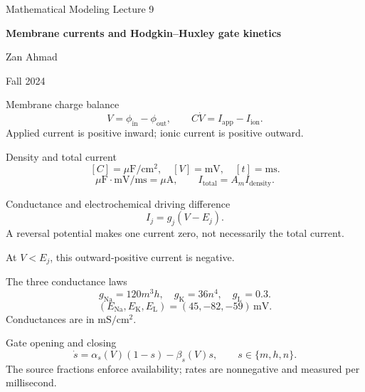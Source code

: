 \documentclass[aspectratio=169,11pt]{beamer}
\newcommand{\notestarget}{notes.pdf}\newcommand{\noteslabel}{Notes}
\begin{document}
\begin{frame}[plain]\vfill
{\small\color{accent} Mathematical Modeling \quad Lecture 9}\par\medskip
{\raggedright{}\LARGE\bfseries\color{ink} Membrane currents and Hodgkin--Huxley gate kinetics}\par\bigskip
Zan Ahmad\par\smallskip
{\small Fall 2024}\par\vfill\end{frame}
\renewcommand{\notestarget}{notes.pdf\#note-membrane-capacitance-and-the-sign-of-current}
\begin{frame}[t,fragile,label=slide-membrane-charge-balance]{Membrane charge balance}
\[V=\phi_{\mathrm{in}}-\phi_{\mathrm{out}},\qquad C\dot V=I_{\mathrm{app}}-I_{\mathrm{ion}}.\]\pause{} Applied current is positive inward; ionic current is positive outward.
\end{frame}
\renewcommand{\notestarget}{notes.pdf\#note-membrane-capacitance-and-the-sign-of-current}
\begin{frame}[t,fragile,label=slide-density-and-total-current]{Density and total current}
\[[C]=\mu\mathrm F/\mathrm{cm}^2,\quad [V]=\mathrm{mV},\quad[t]=\mathrm{ms}.\]\pause{}\[\mu\mathrm F\cdot\mathrm{mV}/\mathrm{ms}=\mu\mathrm A,\qquad I_{\mathrm{total}}=A_mI_{\mathrm{density}}.\]
\end{frame}
\renewcommand{\notestarget}{notes.pdf\#note-conductance-reversal-potential-and-channel-gates}
\begin{frame}[t,fragile,label=slide-conductance-and-electrochemical-driving-difference]{Conductance and electrochemical driving difference}
\[I_j=g_j(V-E_j).\]\pause{} A reversal potential makes one current zero, not necessarily the total current.\par\medskip At $V<E_j$, this outward-positive current is negative.
\end{frame}
\renewcommand{\notestarget}{notes.pdf\#note-conductance-reversal-potential-and-channel-gates}
\begin{frame}[t,fragile,label=slide-the-three-conductance-laws]{The three conductance laws}
\[g_{\mathrm{Na}}=120m^3h,\quad g_{\mathrm K}=36n^4,\quad g_{\mathrm L}=0.3.\]\pause{}\[(E_{\mathrm{Na}},E_{\mathrm K},E_{\mathrm L})=(45,-82,-59)\,\mathrm{mV}.\] Conductances are in $\mathrm{mS}/\mathrm{cm}^2$.
\end{frame}
\renewcommand{\notestarget}{notes.pdf\#note-gate-kinetics-and-the-voltage-clamp-solution}
\begin{frame}[t,fragile,label=slide-gate-opening-and-closing]{Gate opening and closing}
\[\dot s=\alpha_s(V)(1-s)-\beta_s(V)s,\qquad s\in\{m,h,n\}.\]\pause{} The source fractions enforce availability; rates are nonnegative and measured per millisecond.
\end{frame}
\end{document}
